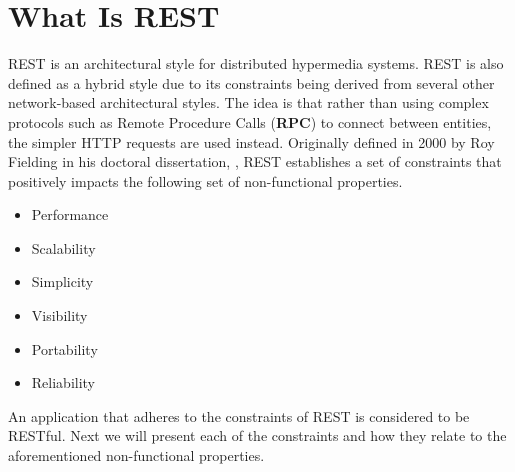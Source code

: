 \section{What Is REST}
REST is an architectural style for distributed hypermedia systems.
REST is also defined as a hybrid style due to its constraints being derived from several other network-based architectural styles.
The idea is that rather than using complex protocols such as Remote Procedure Calls (\textbf{RPC}) to connect between entities, the simpler HTTP requests are used instead.
Originally defined in 2000 by Roy Fielding in his doctoral dissertation, \citep{fielding2000rest}, REST establishes a set of constraints that positively impacts the following set of non-functional properties.
\begin{itemize}
    \item Performance
    \item Scalability
    \item Simplicity
    \item Visibility
    \item Portability
    \item Reliability
\end{itemize}
An application that adheres to the constraints of REST is considered to be RESTful.
Next we will present each of the constraints and how they relate to the aforementioned non-functional properties.

